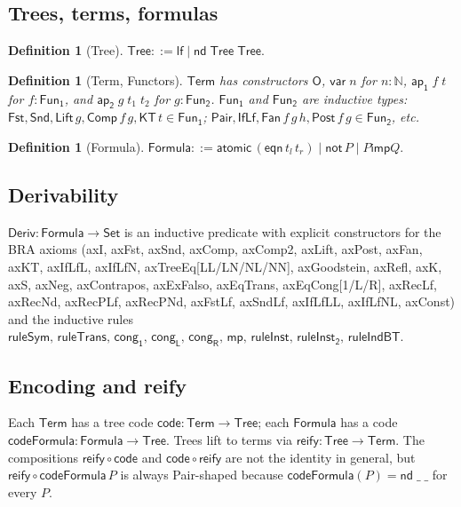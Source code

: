 \documentclass[11pt]{article}
\newtheorem{definition}[theorem]{Definition}
\newcommand{\Deriv}{\mathsf{Deriv}}
\newcommand{\Tree}{\mathsf{Tree}}
\newcommand{\Term}{\mathsf{Term}}
\newcommand{\FunOne}{\mathsf{Fun_1}}
\newcommand{\FunTwo}{\mathsf{Fun_2}}
\newcommand{\Formula}{\mathsf{Formula}}
\newcommand{\Pair}{\mathsf{Pair}}
\newcommand{\Fst}{\mathsf{Fst}}
\newcommand{\Snd}{\mathsf{Snd}}
\newcommand{\IfLf}{\mathsf{IfLf}}
\newcommand{\Lift}{\mathsf{Lift}}
\newcommand{\Comp}{\mathsf{Comp}}
\newcommand{\Fan}{\mathsf{Fan}}
\newcommand{\Post}{\mathsf{Post}}
\newcommand{\KT}{\mathsf{KT}}
\newcommand{\reify}{\mathsf{reify}}
\newcommand{\code}{\mathsf{code}}
\newcommand{\codeFormula}{\mathsf{codeFormula}}
\begin{document}
\subsection{Trees, terms, formulas}

\begin{definition}[Tree]
\(\Tree ::= \mathsf{lf} \mid \mathsf{nd}\;\Tree\;\Tree.\)
\end{definition}

\begin{definition}[Term, Functors]
$\Term$ has constructors $\mathsf{O}$, $\mathsf{var}\;n$ for $n :
\mathbb{N}$, $\mathsf{ap_1}\;f\;t$ for $f : \FunOne$, and
$\mathsf{ap_2}\;g\;t_1\;t_2$ for $g : \FunTwo$.  $\FunOne$ and
$\FunTwo$ are inductive types: $\Fst, \Snd, \Lift\,g, \Comp\,f\,g,
\KT\,t \in \FunOne$; $\Pair, \IfLf, \Fan\,f\,g\,h, \Post\,f\,g \in
\FunTwo$, etc.
\end{definition}

\begin{definition}[Formula]
$\Formula ::= \mathsf{atomic}\,(\mathsf{eqn}\,t_l\,t_r) \mid
\mathsf{not}\,P \mid P \mathbin{\mathsf{imp}} Q.$
\end{definition}

\subsection{Derivability}

$\Deriv : \Formula \to \mathsf{Set}$ is an inductive predicate with
explicit constructors for the BRA axioms (axI, axFst, axSnd,
axComp, axComp2, axLift, axPost, axFan, axKT, axIfLfL, axIfLfN,
axTreeEq[LL/LN/NL/NN], axGoodstein, axRefl, axK, axS, axNeg,
axContrapos, axExFalso, axEqTrans, axEqCong[1/L/R], axRecLf, axRecNd,
axRecPLf, axRecPNd, axFstLf, axSndLf, axIfLfLL, axIfLfNL, axConst)
and the inductive rules
$\mathsf{ruleSym},\,\mathsf{ruleTrans},\,\mathsf{cong_1},\,\mathsf{cong_L},\,
\mathsf{cong_R},\,\mathsf{mp},\,\mathsf{ruleInst},\,\mathsf{ruleInst_2},\,
\mathsf{ruleIndBT}$.

\subsection{Encoding and reify}

Each $\Term$ has a tree code $\code : \Term \to \Tree$; each
$\Formula$ has a code $\codeFormula : \Formula \to \Tree$.  Trees lift
to terms via $\reify : \Tree \to \Term$.  The compositions
$\reify \circ \code$ and $\code \circ \reify$ are not the identity in
general, but $\reify \circ \codeFormula\,P$ is always Pair-shaped
because $\codeFormula(P) = \mathsf{nd}\;\_\;\_$ for every $P$.
\end{document}
